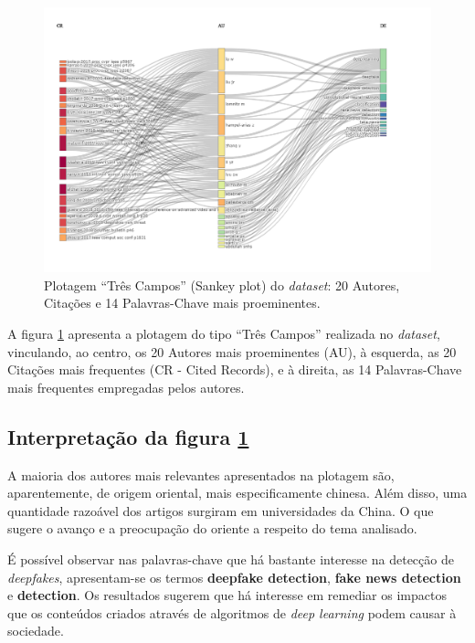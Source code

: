 \begin{figure}
    \centering
    \includegraphics[width=1\textwidth]{experiments/titofrota/PesquisaBibliometrica/Deepfakes/ThreeFieldPlot.png}
    \caption{Plotagem ``Três Campos'' (Sankey plot) do \textit{dataset}: 20 Autores, Citações e 14 Palavras-Chave mais proeminentes.}
    \label{fig:DEEPFAKES@titofrota:ThreeFieldPlot}
\end{figure}

A figura \ref{fig:DEEPFAKES@titofrota:ThreeFieldPlot} apresenta a plotagem do tipo ``Três Campos'' realizada no \textit{dataset}, vinculando, ao centro, os 20 Autores mais proeminentes (AU), à esquerda, as 20 Citações mais frequentes (CR - Cited Records), e à direita, as 14 Palavras-Chave mais frequentes empregadas pelos autores.

\subsection{Interpretação da figura \ref{fig:DEEPFAKES@titofrota:ThreeFieldPlot}}
A maioria dos autores mais relevantes apresentados na plotagem são, aparentemente, de origem oriental, mais especificamente chinesa. Além disso, uma quantidade razoável dos artigos surgiram em universidades da China. O que sugere o avanço e a preocupação do oriente a respeito do tema analisado.

É possível observar nas palavras-chave que há bastante interesse na detecção de \textit{deepfakes}, apresentam-se os termos \textbf{deepfake detection}, \textbf{fake news detection} e \textbf{detection}. Os resultados sugerem que há interesse em remediar os impactos que os conteúdos criados através de algoritmos de \textit{deep learning} podem causar à sociedade.

